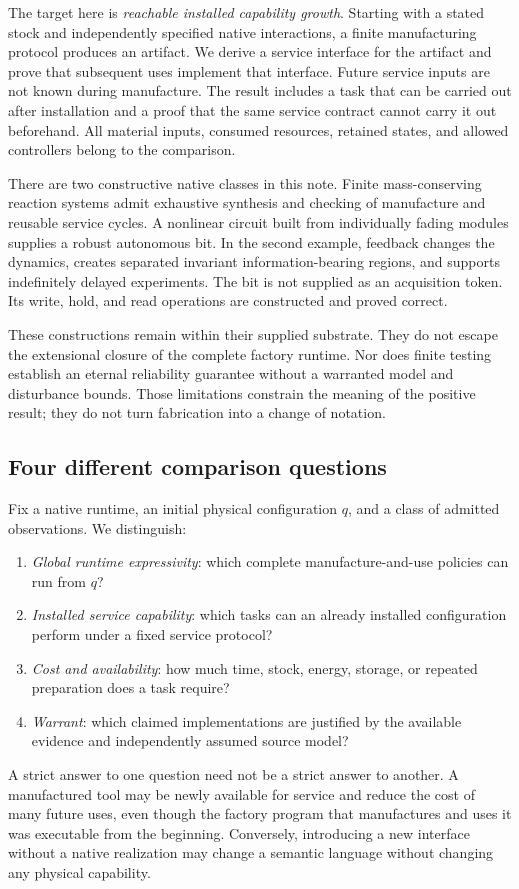 \documentclass[11pt]{article}
\theoremstyle{definition}
\theoremstyle{remark}
\begin{document}
The target here is \emph{reachable installed capability growth}. Starting
with a stated stock and independently specified native interactions, a
finite manufacturing protocol produces an artifact. We derive a service
interface for the artifact and prove that subsequent uses implement that
interface. Future service inputs are not known during manufacture. The
result includes a task that can be carried out after installation and a
proof that the same service contract cannot carry it out beforehand.
All material inputs, consumed resources, retained states, and allowed
controllers belong to the comparison.

There are two constructive native classes in this note. Finite
mass-conserving reaction systems admit exhaustive synthesis and checking
of manufacture and reusable service cycles. A nonlinear circuit built
from individually fading modules supplies a robust autonomous bit. In
the second example, feedback changes the dynamics, creates separated
invariant information-bearing regions, and supports indefinitely delayed
experiments. The bit is not supplied as an acquisition token. Its write,
hold, and read operations are constructed and proved correct.

These constructions remain within their supplied substrate. They do not
escape the extensional closure of the complete factory runtime. Nor does
finite testing establish an eternal reliability guarantee without a
warranted model and disturbance bounds. Those limitations constrain the
meaning of the positive result; they do not turn fabrication into a
change of notation.

\subsection{Four different comparison questions}
Fix a native runtime, an initial physical configuration $q$, and a class
of admitted observations. We distinguish:
\begin{enumerate}[label=(\roman*)]
\item \emph{Global runtime expressivity}: which complete manufacture-and-use
policies can run from $q$?
\item \emph{Installed service capability}: which tasks can an already
installed configuration perform under a fixed service protocol?
\item \emph{Cost and availability}: how much time, stock, energy, storage,
or repeated preparation does a task require?
\item \emph{Warrant}: which claimed implementations are justified by the
available evidence and independently assumed source model?
\end{enumerate}
A strict answer to one question need not be a strict answer to another.
A manufactured tool may be newly available for service and reduce the cost
of many future uses, even though the factory program that manufactures
and uses it was executable from the beginning. Conversely, introducing a
new interface without a native realization may change a semantic language
without changing any physical capability.
\end{document}
